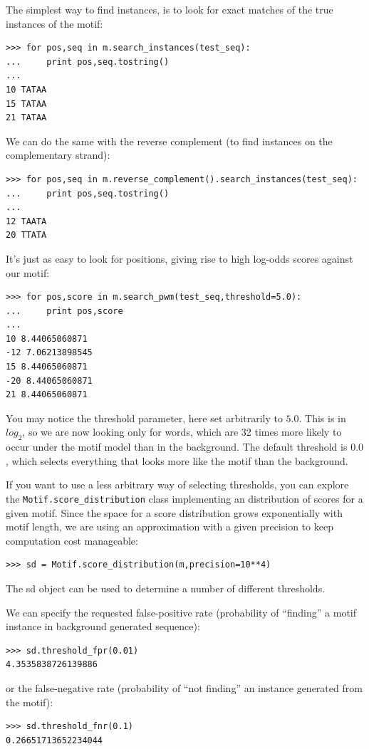 \documentclass{report}
\begin{document}
The simplest way to find instances, is to look for exact matches of
the true instances of the motif:
\begin{verbatim}
>>> for pos,seq in m.search_instances(test_seq):
...     print pos,seq.tostring()
... 
10 TATAA
15 TATAA
21 TATAA
\end{verbatim}
We can do the same with the reverse complement (to find instances on the complementary strand):
\begin{verbatim}
>>> for pos,seq in m.reverse_complement().search_instances(test_seq):
...     print pos,seq.tostring()
... 
12 TAATA
20 TTATA
\end{verbatim}

It's just as easy to look for positions, giving rise to high log-odds scores against our motif:
\begin{verbatim}
>>> for pos,score in m.search_pwm(test_seq,threshold=5.0):
...     print pos,score
... 
10 8.44065060871
-12 7.06213898545
15 8.44065060871
-20 8.44065060871
21 8.44065060871
\end{verbatim}
You may notice the threshold parameter, here set arbitrarily to
$5.0$. This is in $log_2$, so we are now looking only for words, which
are 32 times more likely to occur under the motif model than in the
background. The default threshold is $0.0$, which selects everything
that looks more like the motif than the background.

If you want to use a less arbitrary way of selecting thresholds, you
can explore the \verb|Motif.score_distribution| class implementing an
distribution of scores for a given motif. Since the space for a score
distribution grows exponentially with motif length, we are using an
approximation with a given precision to keep computation cost manageable:
\begin{verbatim}
>>> sd = Motif.score_distribution(m,precision=10**4)
\end{verbatim}
The sd object can be used to determine a number of different thresholds.

We can specify the requested false-positive rate (probability of ``finding'' a motif instance in background generated sequence):
\begin{verbatim}
>>> sd.threshold_fpr(0.01)
4.3535838726139886
\end{verbatim}

or the false-negative rate (probability of ``not finding'' an instance generated from the motif):
\begin{verbatim}
>>> sd.threshold_fnr(0.1)
0.26651713652234044
\end{verbatim}
\end{document}
